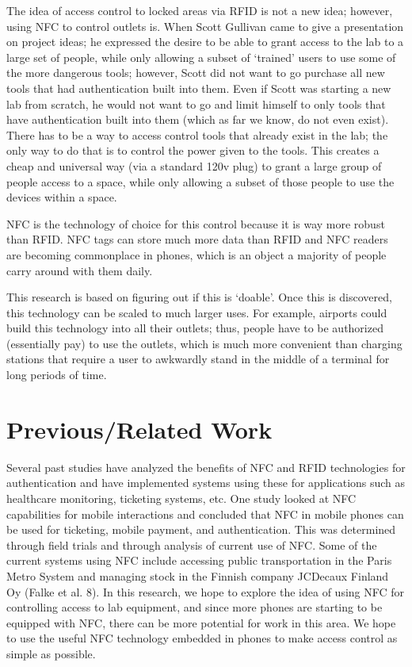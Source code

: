 \documentclass{sigchi}
\begin{document}
The idea of access control to locked areas via RFID is not a new idea; however, using NFC to control outlets is. When Scott Gullivan came to give a presentation on project ideas; he expressed the desire to be able to grant access to the lab to a large set of people, while only allowing a subset of ‘trained’ users to use some of the more dangerous tools; however, Scott did not want to go purchase all new tools that had authentication built into them. Even if Scott was starting a new lab from scratch, he would not want to go and limit himself to only tools that have authentication built into them (which as far we know, do not even exist). There has to be a way to access control tools that already exist in the lab; the only way to do that is to control the power given to the tools. This creates a cheap and universal way (via a standard 120v plug) to grant a large group of people access to a space, while only allowing a subset of those people to use the devices within a space. 

NFC is the technology of choice for this control because it is way more robust than RFID. NFC tags can store much more data than RFID and NFC readers are becoming commonplace in phones, which is an object a majority of people carry around with them daily.

This research is based on figuring out if this is ‘doable’. Once this is discovered, this technology can be scaled to much larger uses. For example, airports could build this technology into all their outlets; thus, people have to be authorized (essentially pay) to use the outlets, which is much more convenient than charging stations that require a user to awkwardly stand in the middle of a terminal for long periods of time. 

\section{Previous/Related Work}

Several past studies have analyzed the benefits of NFC and RFID technologies for authentication and have implemented systems using these for applications such as healthcare monitoring, ticketing systems, etc. One study looked at NFC capabilities for mobile interactions and concluded that NFC in mobile phones can be used for ticketing, mobile payment, and authentication. This was determined through field trials and through analysis of current use of NFC. Some of the current systems using NFC include accessing public transportation in the Paris Metro System and managing stock in the Finnish company JCDecaux Finland Oy (Falke et al. 8). In this research, we hope to explore the idea of using NFC for controlling access to lab equipment, and since more phones are starting to be equipped with NFC, there can be more potential for work in this area. We hope to use the useful NFC technology embedded in phones to make access control as simple as possible.
\end{document}
